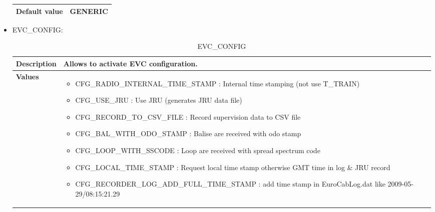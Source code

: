 \documentclass{template/openetcs}
\begin{document}
\begin{itemize}
\begin{longtable}{|l|l|}
				\hline
				
					\begin{minipage}[t]{0.22\linewidth} \textbf{Default value}	\end{minipage} 
				&	\begin{minipage}[t]{0.78\linewidth} GENERIC \end{minipage} \\
				
				\hline
				
			\end{longtable}
			
		\item EVC\_CONFIG:
																			
			\begin{longtable}{|l|l|}
				\caption{EVC\_CONFIG}\\ 
				\hline
				
					\begin{minipage}[t]{0.22\linewidth} \textbf{Description} \end{minipage} 
				&	\begin{minipage}[t]{0.78\linewidth} Allows to activate EVC configuration. \end{minipage} \\
				
				\hline
																																									
					\begin{minipage}[t]{0.22\linewidth} \textbf{Values}	\end{minipage} 
				&	\begin{minipage}[t]{0.78\linewidth} \begin{itemize} 
																								\item CFG\_RADIO\_INTERNAL\_TIME\_STAMP : Internal time stamping (not use T\_TRAIN)
																								\item CFG\_USE\_JRU : Use JRU (generates JRU data file)
																								\item CFG\_RECORD\_TO\_CSV\_FILE : Record supervision data to CSV file
																								\item CFG\_BAL\_WITH\_ODO\_STAMP : Balise are received with odo stamp
																								\item CFG\_LOOP\_WITH\_SSCODE : Loop are received with spread spectrum code
																								\item CFG\_LOCAL\_TIME\_STAMP : Request local time stamp otherwise GMT time in log \& JRU record
																								\item CFG\_RECORDER\_LOG\_ADD\_FULL\_TIME\_STAMP : add time stamp in EuroCabLog.dat like 2009-05-29/08:15:21.29
																							\end{itemize} 
					\end{minipage} \\
				

\end{longtable}
\end{itemize}
\end{document}
